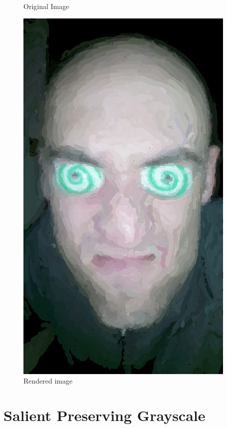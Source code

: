 \documentclass[10pt,twocolumn]{article}
\begin{document}
\begin{figure}
\begin{minipage}{0.24\textwidth}
\caption{Original Image}
\end{minipage}
\begin{minipage}{0.24\textwidth}
\centering \includegraphics[width=\textwidth]{pfacebasic.jpg}
\caption{Rendered image}
\end{minipage}
\end{figure}

\section{Salient Preserving Grayscale}
\end{document}
